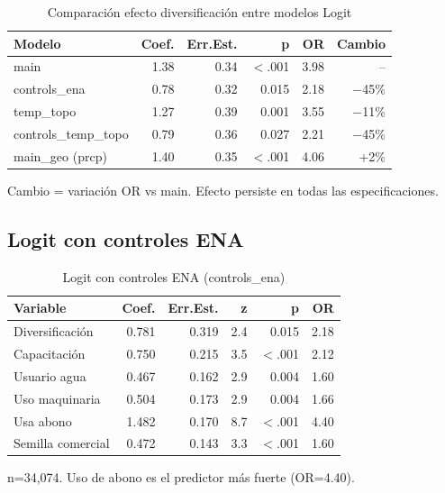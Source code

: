 \documentclass[11pt,a4paper]{article}
\begin{document}
\begin{table}[H]
\centering
\caption{Comparación efecto diversificación entre modelos Logit}
\label{tab:logit_compare_all}
\begin{threeparttable}
\small
\begin{tabular}{lrrrrr}
\toprule
\textbf{Modelo} & \textbf{Coef.} & \textbf{Err.Est.} & \textbf{p} & \textbf{OR} & \textbf{Cambio} \\
\midrule
main & 1.38 & 0.34 & $<$.001 & 3.98 & -- \\
controls\_ena & 0.78 & 0.32 & 0.015 & 2.18 & $-$45\% \\
temp\_topo & 1.27 & 0.39 & 0.001 & 3.55 & $-$11\% \\
controls\_temp\_topo & 0.79 & 0.36 & 0.027 & 2.21 & $-$45\% \\
main\_geo (prcp) & 1.40 & 0.35 & $<$.001 & 4.06 & +2\% \\
\bottomrule
\end{tabular}
\begin{tablenotes}
\footnotesize
\item Cambio = variación OR vs main. Efecto persiste en todas las especificaciones.
\end{tablenotes}
\end{threeparttable}
\end{table}

\subsection{Logit con controles ENA}

\begin{table}[H]
\centering
\caption{Logit con controles ENA (controls\_ena)}
\label{tab:logit_controls_ena}
\begin{threeparttable}
\small
\begin{tabular}{lrrrrr}
\toprule
\textbf{Variable} & \textbf{Coef.} & \textbf{Err.Est.} & \textbf{z} & \textbf{p} & \textbf{OR} \\
\midrule
Diversificación & 0.781 & 0.319 & 2.4 & 0.015 & 2.18 \\
Capacitación & 0.750 & 0.215 & 3.5 & $<$.001 & 2.12 \\
Usuario agua & 0.467 & 0.162 & 2.9 & 0.004 & 1.60 \\
Uso maquinaria & 0.504 & 0.173 & 2.9 & 0.004 & 1.66 \\
Usa abono & 1.482 & 0.170 & 8.7 & $<$.001 & 4.40 \\
Semilla comercial & 0.472 & 0.143 & 3.3 & $<$.001 & 1.60 \\
\bottomrule
\end{tabular}
\begin{tablenotes}
\footnotesize
\item n=34,074. Uso de abono es el predictor más fuerte (OR=4.40).
\end{tablenotes}
\end{threeparttable}
\end{table}
\end{document}

